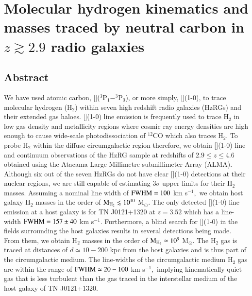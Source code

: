 \chapter[Neutral carbon in high-redshift radio galaxy gas haloes]{Molecular hydrogen kinematics and masses traced by neutral carbon in $z \gtrsim 2.9$ radio galaxies}\label{chapter4}

\section*{Abstract}
We have used atomic carbon, []($^3$P$_1 - ^3$P$_0$), or more simply, [](1-0), to trace molecular hydrogen (H$_2$) within seven high redshift radio galaxies (HzRGs) and their extended gas haloes. [](1-0) line emission is frequently used to trace H$_2$ in low gas density and metallicity regions where cosmic ray energy densities are high enough to cause wide-scale photodissociation of $^{12}${CO} which also traces H$_2.$ To probe H$_2$ within the diffuse circumgalactic region therefore, we obtain [](1-0) line and continuum observations of the HzRG sample at redshifts of $2.9 \leq z \leq 4.6$ obtained using the Atacama Large Millimetre-submillimeter Array (ALMA). Although six out of the seven HzRGs do not have clear [](1-0) detections at their nuclear regions, we are still capable of estimating $3\sigma$ upper limits for their H$_2$ masses. Assuming a nominal line width of $\rm FWHM = 100$ km s$^{-1},$ we obtain host galaxy H$_2$ masses in the order of $\rm M_{H_2} \lesssim10^{10}$ M$_\odot.$ The only detected [](1-0) line emission at a host galaxy is for TN J0121+1320 at $z=3.52$ which has a line-width $\rm FWHM = 157 \pm 40$ km s$^{-1}.$ Furthermore, a blind search for [](1-0) in the fields surrounding the host galaxies results in several detections being made. From them, we obtain H$_2$ masses in the order of $\rm M_{H_2} \simeq 10^9$ M$_\odot.$ The H$_2$ gas is traced at distances of $d \simeq 10 - 200$ kpc from the host galaxies and is thus part of the circumgalactic medium. The line-widths of the circumgalactic medium H$_2$ gas are within the range of $\rm FWHM \simeq 20 - 100$ km s$^{-1},$ implying kinematically quiet gas that is less turbulent than the gas traced in the interstellar medium of the host galaxy of TN J0121+1320. 



